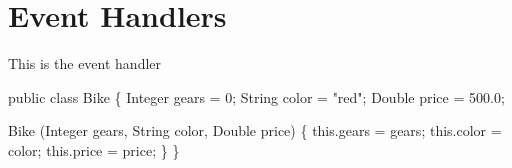 \documentclass[fancy, oneside, mastersfancy, ms]{byuthesis}
\newenvironment{Shaded}{\begin{snugshade}}{\end{snugshade}}
\newcommand{\BuiltInTok}[1]{\textcolor[rgb]{0.00,0.23,0.31}{#1}}
\newcommand{\DecValTok}[1]{\textcolor[rgb]{0.68,0.00,0.00}{#1}}
\newcommand{\FloatTok}[1]{\textcolor[rgb]{0.68,0.00,0.00}{#1}}
\newcommand{\FunctionTok}[1]{\textcolor[rgb]{0.28,0.35,0.67}{#1}}
\newcommand{\KeywordTok}[1]{\textcolor[rgb]{0.00,0.23,0.31}{#1}}
\newcommand{\NormalTok}[1]{\textcolor[rgb]{0.00,0.23,0.31}{#1}}
\newcommand{\OperatorTok}[1]{\textcolor[rgb]{0.37,0.37,0.37}{#1}}
\newcommand{\StringTok}[1]{\textcolor[rgb]{0.13,0.47,0.30}{#1}}
\begin{document}
\cleardoublepage
{}
{}
\appendix

\hypertarget{event-handlers}{%
\chapter{Event Handlers}\label{event-handlers}}

This is the event handler

\begin{Shaded}
\begin{Highlighting}[]
\KeywordTok{public} \KeywordTok{class}\NormalTok{ Bike }\OperatorTok{\{}
    \BuiltInTok{Integer}\NormalTok{ gears }\OperatorTok{=} \DecValTok{0}\OperatorTok{;}
    \BuiltInTok{String}\NormalTok{ color }\OperatorTok{=} \StringTok{"red"}\OperatorTok{;}
    \BuiltInTok{Double}\NormalTok{ price }\OperatorTok{=} \FloatTok{500.0}\OperatorTok{;}

    \FunctionTok{Bike} \OperatorTok{(}\BuiltInTok{Integer}\NormalTok{ gears}\OperatorTok{,} \BuiltInTok{String}\NormalTok{ color}\OperatorTok{,} \BuiltInTok{Double}\NormalTok{ price}\OperatorTok{)} \OperatorTok{\{}
        \KeywordTok{this}\OperatorTok{.}\FunctionTok{gears} \OperatorTok{=}\NormalTok{ gears}\OperatorTok{;}
        \KeywordTok{this}\OperatorTok{.}\FunctionTok{color} \OperatorTok{=}\NormalTok{ color}\OperatorTok{;}
        \KeywordTok{this}\OperatorTok{.}\FunctionTok{price} \OperatorTok{=}\NormalTok{ price}\OperatorTok{;}
    \OperatorTok{\}}
\OperatorTok{\}}
\end{Highlighting}
\end{Shaded}
\end{document}
